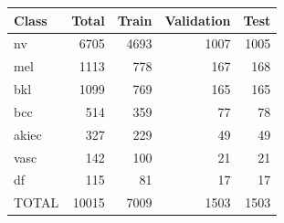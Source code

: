 \begin{tabular}{lrrrr}
\hline
Class & Total & Train & Validation & Test \\
\hline
nv & 6705 & 4693 & 1007 & 1005 \\
mel & 1113 & 778 & 167 & 168 \\
bkl & 1099 & 769 & 165 & 165 \\
bcc & 514 & 359 & 77 & 78 \\
akiec & 327 & 229 & 49 & 49 \\
vasc & 142 & 100 & 21 & 21 \\
df & 115 & 81 & 17 & 17 \\
TOTAL & 10015 & 7009 & 1503 & 1503 \\
\hline
\end{tabular}
